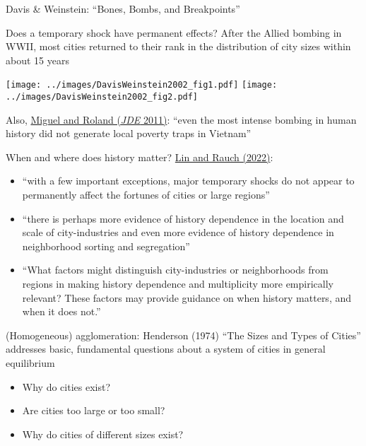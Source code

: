 \documentclass[11pt,notes=hide,aspectratio=169]{beamer}
\begin{document}
\begin{frame}{Davis \& Weinstein: ``Bones, Bombs, and Breakpoints''}
{\small Does a temporary shock have permanent effects? After the Allied bombing in WWII, most cities returned to their rank in the distribution of city sizes within about 15 years \par}
\texttt{[image: ../images/DavisWeinstein2002\_fig1.pdf]}
\texttt{[image: ../images/DavisWeinstein2002\_fig2.pdf]}\\
{Also, \href{https://www.sciencedirect.com/science/article/pii/S0304387810000817}{Miguel and Roland (\textit{JDE} 2011)}: ``even the most intense bombing in human history did not generate local poverty traps in Vietnam''\par}
\end{frame}
\begin{frame}{When and where does history matter?}
\href{https://doi.org/10.1016/j.regsciurbeco.2020.103628}{Lin and Rauch (2022)}:
\begin{itemize}
\item ``with a few important exceptions, major temporary shocks do not appear to permanently affect the fortunes of cities or large regions''
\item ``there is perhaps more evidence of history dependence in the location and scale of city-industries and even more evidence of history dependence in neighborhood sorting and segregation''
\item ``What factors might distinguish city-industries or neighborhoods from regions in making history dependence and multiplicity more empirically relevant?
These factors may provide guidance on when history matters, and when it does not.''
\end{itemize}
\end{frame}
\begin{frame}{(Homogeneous) agglomeration: Henderson (1974)}
``The Sizes and Types of Cities'' addresses basic, fundamental questions about a system of cities in general equilibrium
\begin{itemize}
\item Why do cities exist? 
\item Are cities too large or too small?
\item Why do cities of different sizes exist?
\end{itemize}
\end{frame}
\end{document}
